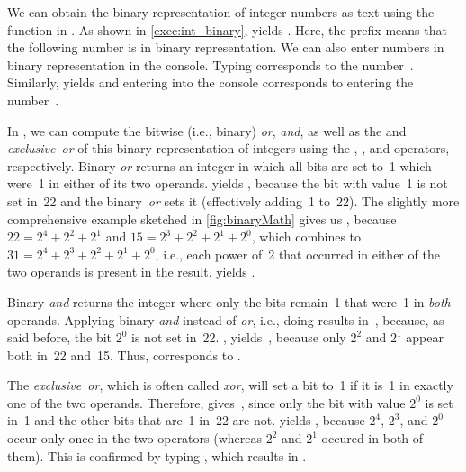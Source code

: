 We can obtain the binary representation of integer numbers as text using the  function in \python.
As shown in \cref{exec:int_binary},  yields .
Here, the  prefix means that the following number is in binary representation.
We can also enter numbers in binary representation in the console.
Typing  corresponds to the number~.
Similarly,  yields  and entering  into the console corresponds to entering the number~.

In \python, we can compute the bitwise (i.e., binary) \emph{or}, \emph{and}, as well as the and \emph{exclusive~or} of this binary representation of integers using the \pythonil{|}, \pythonil{&}, and \pythonil{^} operators, respectively.
Binary \emph{or} returns an integer in which all bits are set to~1 which were~1 in either of its two operands.
 yields , because the bit with value~1 is not set in~22 and the binary~\emph{or} sets it (effectively adding~1 to~22).
The slightly more comprehensive example  sketched in \cref{fig:binaryMath} gives us , because $22=2^4+2^2+2^1$ and $15=2^3+2^2+2^1+2^0$, which \pythonil{|} combines to $31=2^4+2^3+2^2+2^1+2^0$, i.e., each power of~2 that occurred in either of the two operands is present in the result.
 yields .

Binary \emph{and} returns the integer where only the bits remain~1 that were~1 in \emph{both} operands.
Applying binary \emph{and} instead of \emph{or}, i.e., doing \pythonIdx{\&} results in~, because, as said before, the bit $2^0$ is not set in~22.
, yields~, because only $2^2$ and $2^1$ appear both in~22 and~15.
Thus,  corresponds to .

The \emph{exclusive~or}, which is often called \emph{xor}, will set a bit to~1 if it is~1 in exactly one of the two operands.
Therefore, \pythonIdx{\^{}} gives~, since only the bit with value $2^0$ is set in~1 and the other bits that are~1 in~22 are not.
 yields , because $2^4$, $2^3$, and $2^0$ occur only once in the two operators (whereas $2^2$ and $2^1$ occured in both of them).
This is confirmed by typing , which results in .

